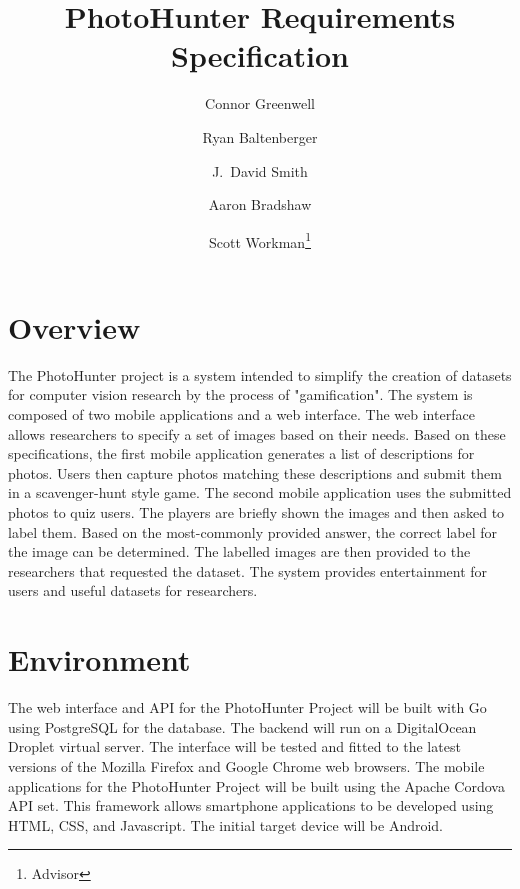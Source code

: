 \documentclass{article}
\title{PhotoHunter Requirements Specification
}
\author{Connor Greenwell \and Ryan Baltenberger 
  \and J.\ David Smith \and Aaron Bradshaw
  \and Scott Workman\footnote{Advisor}}
\begin{document}
\maketitle

\section{Overview}
The PhotoHunter project is a system intended to simplify the creation of
datasets for computer vision research by the process of "gamification". The
system is composed of two mobile applications and a web interface. The web
interface allows researchers to specify a set of images based on their needs.
Based on these specifications, the first mobile application generates a list of
descriptions for photos. Users then capture photos matching these descriptions
and submit them in a scavenger-hunt style game. The second mobile application
uses the submitted photos to quiz users. The players are briefly shown the
images and then asked to label them. Based on the most-commonly provided
answer, the correct label for the image can be determined. The labelled images
are then provided to the researchers that requested the dataset. The system
provides entertainment for users and useful datasets for researchers.

\section{Environment}
The web interface and API for the PhotoHunter Project will be built with Go using PostgreSQL for the database. The backend will run on a DigitalOcean Droplet virtual server. The interface will be tested and fitted to the latest versions of the Mozilla Firefox and Google Chrome web browsers. The mobile applications for the PhotoHunter Project will be built using the Apache Cordova API set. This framework allows smartphone applications to be developed using HTML, CSS, and Javascript. The initial target device will be Android. 
\end{document}
